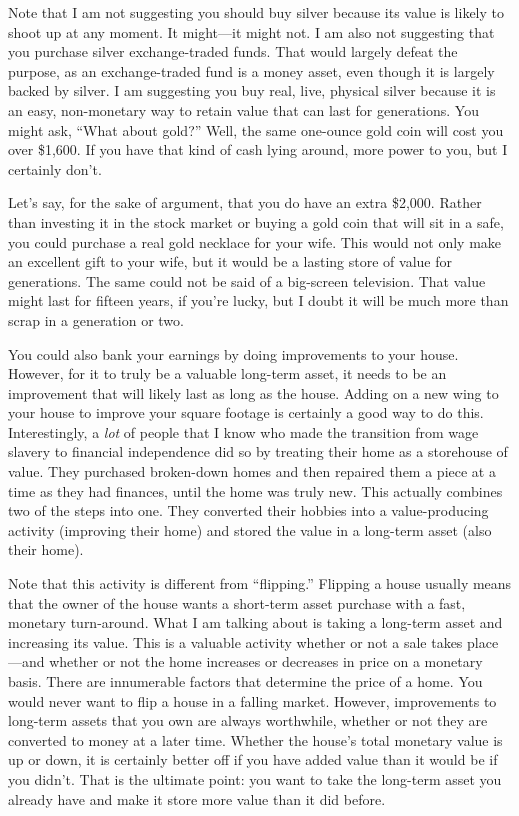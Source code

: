 Note that I am not suggesting you should buy silver because its value is
likely to shoot up at any moment. It might—it might not. I am also not
suggesting that you purchase silver exchange-traded funds. That would
largely defeat the purpose, as an exchange-traded fund is a money
asset, even though it is largely backed by silver. I am suggesting you
buy real, live, physical silver because it is an easy, non-monetary way
to retain value that can last for generations. You might ask, “What
about gold?”  Well, the same one-ounce gold coin will cost you over
\$1,600. If you have that kind of cash lying around, more power to you,
but I certainly don’t. 

Let’s say, for the sake of argument, that you do have an extra \$2,000.
Rather than investing it in the stock market or buying a gold coin that
will sit in a safe, you could purchase a real gold necklace for your
wife. This would not only make an excellent gift to your wife, but it
would be a lasting store of value for generations. The same could not
be said of a big-screen television. That value might last for fifteen
years, if you’re lucky, but I doubt it will be much more than scrap in
a generation or two. 

You could also bank your earnings by doing improvements to your house.
However, for it to truly be a valuable long-term asset, it needs to be
an improvement that will likely last as long as the house. Adding on a
new wing to your house to improve your square footage is certainly a
good way to do this. Interestingly, a \textit{lot} of people that I
know who made the transition from wage slavery to financial
independence did so by treating their home as a storehouse of value.
They purchased broken-down homes and then repaired them a piece at a
time as they had finances, until the home was truly new. This actually
combines two of the steps into one. They converted their hobbies into a
value-producing activity (improving their home) and stored the value in
a long-term asset (also their home). 

Note that this activity is different from “flipping.”  Flipping a house
usually means that the owner of the house wants a short-term asset
purchase with a fast, monetary turn-around. What I am talking about is
taking a long-term asset and increasing its value. This is a valuable
activity whether or not a sale takes place—and whether or not the home
increases or decreases in price on a monetary basis. There are
innumerable factors that determine the price of a home. You would never
want to flip a house in a falling market. However, improvements to
long-term assets that you own are always worthwhile, whether or not
they are converted to money at a later time. Whether the
house's total monetary value is up or down, it is
certainly better off if you have added value than it would be if you
didn’t. That is the ultimate point: you want to take the long-term
asset you already have and make it store more value than it did
before.

